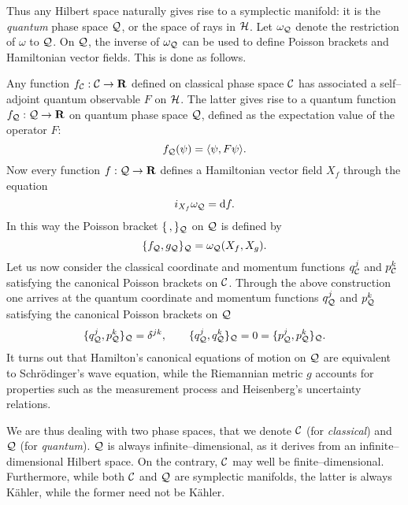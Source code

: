 \documentclass[a4paper,a4paper]{article}
\begin{document}
Thus any Hilbert space naturally gives rise to a symplectic manifold:
it is the {\it quantum} phase space ${\cal Q}$, or the space of rays in ${\cal H}$. 
Let $\omega_{\cal Q}$ denote the restriction of $\omega$ to ${\cal Q}$.
On ${\cal Q}$, the inverse of $\omega_{\cal Q}$ can be used to define Poisson brackets 
and Hamiltonian vector fields. This is done as follows.

Any function $f_{\cal C}:{\cal C}\to {\bf R}$ defined on classical phase 
space ${\cal C}$ has associated a self--adjoint quantum observable $F$
on ${\cal H}$. The latter gives rise to a quantum function $f_{\cal Q}:{\cal Q}\to {\bf R}$
on quantum phase space ${\cal Q}$, defined as the expectation value of the operator $F$:
\begin{equation}
f_{\cal Q}(\psi)=\langle\psi,F\psi\rangle.
\label{func}
\end{equation} 
Now every function $f:{\cal Q}\to {\bf R}$ defines a Hamiltonian vector field 
$X_f$ through the equation \cite{RATIU}
\begin{equation}
i_{X_f} \omega_{\cal Q} = {\rm d} f.
\label{hamvf}
\end{equation}
In this way the Poisson bracket $\{\,,\}_{\cal Q}$ on ${\cal Q}$ is defined 
by \cite{RATIU}
\begin{equation}
\{f_{\cal Q}, g_{\cal Q}\}_{\cal Q} = \omega_{\cal Q} (X_f, X_g).
\label{pois}
\end{equation} 
Let us now consider the classical coordinate and momentum  
functions $q^j_{\cal C}$ and $p^k_{\cal C}$ satisfying the 
canonical Poisson brackets on ${\cal C}$. Through the above construction one arrives at 
the quantum coordinate and momentum functions $q^j_{\cal Q}$ and $p^k_{\cal Q}$
satisfying the canonical Poisson brackets on ${\cal Q}$
\begin{equation}
\{q^j_{\cal Q}, p^k_{\cal Q}\}_{\cal Q}=\delta^{jk},\qquad
\{q^j_{\cal Q}, q^k_{\cal Q}\}_{\cal Q}=0=\{p^j_{\cal Q}, p^k_{\cal Q}\}_{\cal Q}.
\end{equation}
It turns out that Hamilton's canonical equations of motion on ${\cal Q}$ are equivalent 
to Schr\"odinger's  wave equation, while the Riemannian metric $g$ accounts for properties 
such as the measurement process and Heisenberg's uncertainty relations.

We are thus dealing with two phase spaces, that we denote ${\cal C}$ (for {\it classical}\/) 
and ${\cal Q}$ (for {\it quantum}). ${\cal Q}$ is always infinite--dimensional, 
as it derives from an infinite--dimensional Hilbert space. 
On the contrary, ${\cal C}$ may well be finite--dimensional. 
Furthermore, while both ${\cal C}$ and ${\cal Q}$ are symplectic manifolds, 
the latter is always K\"ahler, while the former need not be K\"ahler.
\end{document}
